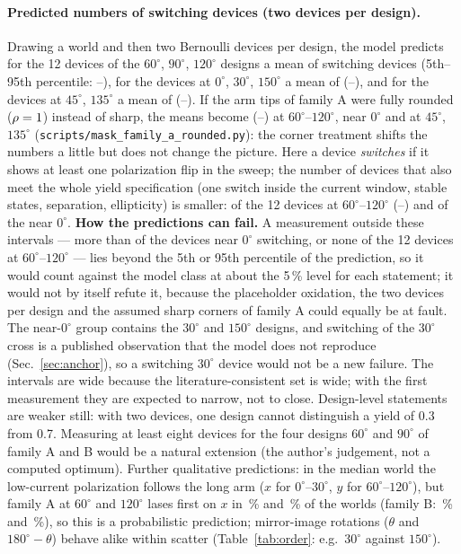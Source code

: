\paragraph{Predicted numbers of switching devices (two devices per design).} Drawing a world and then two Bernoulli devices per design, the model predicts for the 12 devices of the $60^\circ$, $90^\circ$, $120^\circ$ designs a mean of \cntHighMean{} switching devices (5th--95th percentile: \cntHighLo--\cntHighHi), for the \cntNearZeroN{} devices at $0^\circ$, $30^\circ$, $150^\circ$ a mean of \cntNearZeroMean{} (\cntNearZeroLo--\cntNearZeroHi), and for the \cntMidN{} devices at $45^\circ$, $135^\circ$ a mean of \cntMidMean{} (\cntMidLo--\cntMidHi).
If the arm tips of family A were fully rounded ($\rho=1$) instead of sharp, the means become \cntHighRoundMean{} (\cntHighRoundLo--\cntHighRoundHi) at $60^\circ$--$120^\circ$, \cntNearZeroRoundMean{} near $0^\circ$ and \cntMidRoundMean{} at $45^\circ$, $135^\circ$ (\texttt{scripts/mask\_family\_a\_rounded.py}): the corner treatment shifts the numbers a little but does not change the picture.
Here a device \emph{switches} if it shows at least one polarization flip in the sweep; the number of devices that also meet the whole yield specification (one switch inside the current window, stable states, separation, ellipticity) is smaller: \cntHighPassMean{} of the 12 devices at $60^\circ$--$120^\circ$ (\cntHighPassLo--\cntHighPassHi) and \cntNearZeroPassMean{} of the \cntNearZeroN{} near $0^\circ$.
\textbf{How the predictions can fail.} A measurement outside these intervals --- more than \cntNearZeroHi{} of the \cntNearZeroN{} devices near $0^\circ$ switching, or none of the 12 devices at $60^\circ$--$120^\circ$ --- lies beyond the 5th or 95th percentile of the prediction, so it would count against the model class at about the 5\,\% level for each statement; it would not by itself refute it, because the placeholder oxidation, the two devices per design and the assumed sharp corners of family A could equally be at fault. The near-$0^\circ$ group contains the $30^\circ$ and $150^\circ$ designs, and switching of the $30^\circ$ cross is a published observation that the model does not reproduce (Sec.~\ref{sec:anchor}), so a switching $30^\circ$ device would not be a new failure.
The intervals are wide because the literature-consistent set is wide; with the first measurement they are expected to narrow, not to close.
Design-level statements are weaker still: with two devices, one design cannot distinguish a yield of 0.3 from 0.7. Measuring at least eight devices for the four designs $60^\circ$ and $90^\circ$ of family A and B would be a natural extension (the author's judgement, not a computed optimum).
Further qualitative predictions: in the median world the low-current polarization follows the long arm ($x$ for $0^\circ$--$30^\circ$, $y$ for $60^\circ$--$120^\circ$), but family A at $60^\circ$ and $120^\circ$ lases first on $x$ in \xLikeAsixty\,\% and \xLikeAonetwenty\,\% of the worlds (family B: \xLikeBsixty\,\% and \xLikeBonetwenty\,\%), so this is a probabilistic prediction; mirror-image rotations ($\theta$ and $180^\circ-\theta$) behave alike within scatter (Table~\ref{tab:order}: e.g.\ $30^\circ$ against $150^\circ$).
